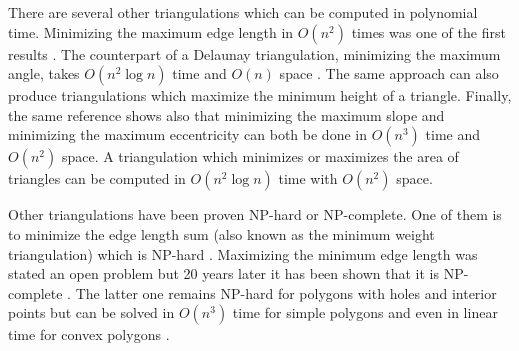 There are several other triangulations which can be computed in
polynomial time. Minimizing the maximum edge length in \(O(n^2)\)
times was one of the first results \cite{triangulation_minmax_length}.
The counterpart of a Delaunay triangulation, 
minimizing the maximum angle, takes \(O(n^2 \log n)\) time and
\(O(n)\) space \cite{triangulation_edge_insertion}. The same
approach can also produce triangulations which maximize the minimum 
height of a triangle. Finally, the same reference shows also that 
minimizing the maximum slope and minimizing the maximum eccentricity 
can both be done in \(O(n^3)\) time and \(O(n^2)\) space. A 
triangulation which minimizes or maximizes the area of triangles can
be computed in \(O(n^2 \log n)\) time with \(O(n^2)\) space.
\cite{triangulation_area}

Other triangulations have been proven NP-hard or NP-complete. One
of them is to minimize the edge length sum (also known as the minimum
weight triangulation) which is NP-hard \cite{mwt_complexity}. 
Maximizing the minimum edge length was stated an open problem
\cite{triangulation_minmax_length} but 20 years later it has been
shown that it is NP-complete \cite{mmlt_complexity}. The latter one
remains NP-hard for polygons with holes and interior points
\cite{mmlt_polygons} but can be solved in \(O(n^3)\) time for simple
polygons and even in linear time for convex polygons
\cite{mmlt_convex_polygons}.

